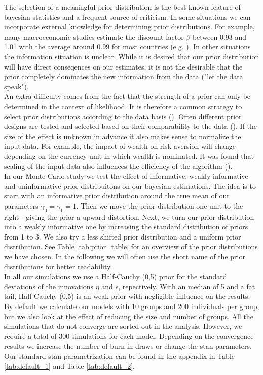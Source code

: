 The selection of a meaningful prior distribution is the best known feature of bayesian statistics and a frequent source of criticism. In some situations we can incorporate external knowledge for determining prior distributions. For example, many macroeconomic studies estimate the discount factor $\beta$ between 0.93 and 1.01 with the average around 0.99 for most countries (e.g. \cite{rumler2007}).
In other situations the information situation is unclear. While it is desired that our prior distribution will have direct conseqences on our estimates, it is not the desirable that the prior completely dominates the new information from the data ("let the data speak").\\
An extra difficulty comes from the fact that the strength of a prior can only be determined in the context of likelihood. It is therefore a common strategy to select prior distributions according to the data basis (\cite{gelman2017prior}). 
Often different prior designs are tested and selected based on their comparability to the data (\cite{leeper2017clearing}).
If the size of the effect is unknown in advance it also makes sense to normalize the input data. For example, the impact of wealth on risk aversion will change depending on the currency unit in which wealth is nominated. It was found that scaling of the input data also influences the efficiency of the algorithm (\cite{gelman2008weakly}). \\
In our Monte Carlo study we test the effect of informative, weakly informative and uninformative prior distribuitons on our bayesian estimations.
The idea is to start with an informative prior distribution around the true mean of our parameters $\gamma_0=\gamma_1=1$. Then we move the prior distribution one unit to the right - giving the prior a upward distortion.
Next, we turn our prior distribution into a weakly informative one by increasing the standard distribution of priors from 1 to 3.
We also try a less shifted prior distribution and a uniform prior distribution. See Table \ref{tab:prior_table} for an overview of the prior distributions we have chosen. In the following we will often use the short name of the prior distributions for better readability.\\
In all our simulations we use a Half-Cauchy (0,5) prior for the standard deviations of the innovations $\eta$ and $\epsilon$, repectively. With an median of 5 and a fat tail, Half-Cauchy (0,5)  is an weak prior with negligible influence on the results.
By default we calculate our models with 10 groups and 200 individuals per group, but we also look at the effect of reducing the size and number of groups. All the simulations that do not converge are sorted out in the analysis.
However, we require a total of 300 simulations for each model. Depending on the convergence results we increase the number of burn-in draws or change the stan parameters. Our standard stan parametrization can be found in the appendix  in Table \ref{tab:default_1} and Table \ref{tab:default_2}.



